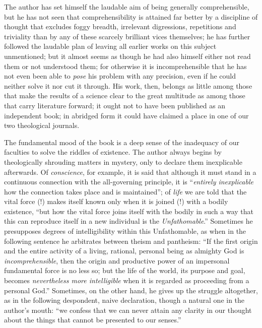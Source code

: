 \documentclass[12pt,a4paper,openany]{book}
\newcommand{\opage}[1]{\marginnote{\footnotesize\textit{[#1]}}}
\begin{document}
The author has set himself the laudable aim of being generally
comprehensible, but he has not seen that comprehensibility is attained far
better by a discipline of thought that excludes foggy breadth, irrelevant
digressions, repetitions and triviality than by any of these scarcely
brilliant vices themselves; he has further followed the laudable plan of
leaving all earlier works on this subject unmentioned; but it almost seems
as though he had also himself either not read them or not understood them;
for otherwise it is incomprehensible that he has not even been able to
\emph{pose} his problem with any precision, even if he could neither solve
it nor cut it through. His work, then, belongs as little among those that
make the results of a science clear to the great multitude as among those
that carry literature forward; it ought not to have been published as an
independent book; in abridged form it could have claimed a place in one of
our two theological journals.

The fundamental mood of the book is a deep sense of the inadequacy of our
faculties to solve the riddles of existence. The
\opage{23}author always begins by theologically shrouding matters in mystery,
only to declare them inexplicable afterwards. Of \emph{conscience}, for
example, it is said that although it must stand in a continuous connection
with the all-governing principle, it is ``\emph{entirely inexplicable} how
the connection takes place and is maintained''; of \emph{life} we are told
that the vital force (!) makes itself known only when it is joined (!) with
a bodily existence, ``but how the vital force joins itself with the bodily
in such a way that this can reproduce itself in a new individual is the
\emph{Unfathomable}.'' Sometimes he presupposes degrees of intelligibility
within this Unfathomable, as when in the following sentence he arbitrates
between theism and pantheism: ``If the first origin and the entire activity
of a living, rational, personal being as almighty God is
\emph{incomprehensible}, then the origin and productive power of an
impersonal fundamental force is no less so; but the life of the world, its
purpose and goal, becomes \emph{nevertheless more intelligible} when it is
regarded as proceeding from a personal God.'' Sometimes, on the other hand,
he gives up the struggle altogether, as in the following despondent, naive
declaration, though a natural one in the author's mouth: ``we confess that
we can never attain any clarity in our thought about the things that cannot
be presented to our senses.''
\end{document}
